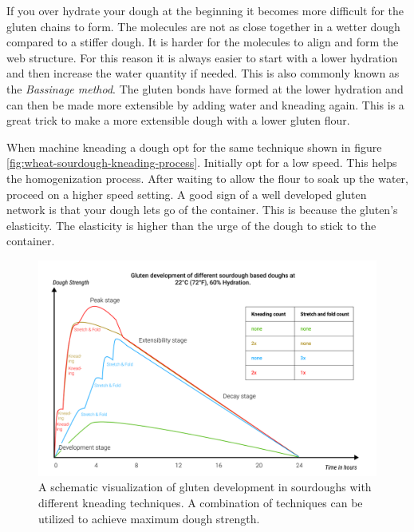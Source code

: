 If you over hydrate your dough at the beginning it becomes more difficult
for the gluten chains to form. The molecules are not as close together in
a wetter dough compared to a stiffer dough. It is harder for the molecules
to align and form the web structure. For this reason it is always easier
to start with a lower hydration and then increase the water quantity if needed.
This is also commonly known as the \textit{Bassinage method}. The gluten
bonds have formed at the lower hydration and can then be made more extensible
by adding water and kneading again. This is a great trick to make
a more extensible dough with a lower gluten flour. \cite{bassinage+technique}

When machine kneading a dough opt for the same technique shown in figure \ref*{fig:wheat-sourdough-kneading-process}.
Initially opt for a low speed. This helps the homogenization process.
After waiting to allow the flour to soak up the water, proceed on a higher speed
setting. A good sign of a well developed gluten network is
that your dough lets go of the container. This is because the gluten's elasticity.
The elasticity is higher than the urge of the
dough to stick to the container. 

\begin{figure}[!htb]
  \includegraphics[width=\textwidth]{dough-strength-sourdough}
  \caption{A schematic visualization of
  gluten development in sourdoughs with different kneading techniques.
  A combination of techniques can be utilized to achieve maximum
  dough strength.
  }
\end{figure}


